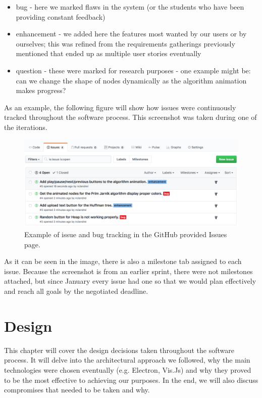 \documentclass{l4proj}
\begin{document}
\begin{itemize}
    \item bug - here we marked flaws in the system (or the students who have been providing constant feedback)
    \item enhancement - we added here the features most wanted by our users or by ourselves; this was refined from the
	requirements gatherings previously mentioned that ended up as multiple user stories eventually
    \item question - these were marked for research purposes - one example might be: can we change the shape of nodes
	dynamically as the algorithm animation makes progress?
\end{itemize}

As an example, the following figure will show how issues were continuously tracked throughout the software process.
This screenshot was taken during one of the iterations.

\begin{figure}[!ht]
    \centering
    \includegraphics[scale=0.5]{issue-tracking}
    \caption{Example of issue and bug tracking in the GitHub provided Issues page.}
    \label{fig:issue-tracking}
\end{figure}

As it can be seen in the image, there is also a milestone tab assigned to each issue. Because the screenshot is
from an earlier sprint, there were not milestones attached, but since January every issue had one so that we
would plan effectively and reach all goals by the negotiated deadline.


\chapter{Design}
\label{design}

This chapter will cover the design decisions taken throughout the software process. It will delve into the
architectural approach we followed, why the main
technologies were chosen eventually (e.g. Electron, Vis.Js) and why they proved to be the most effective to achieving
our purposes. In the end, we will also discuss compromises that needed to be taken and why.
\end{document}
